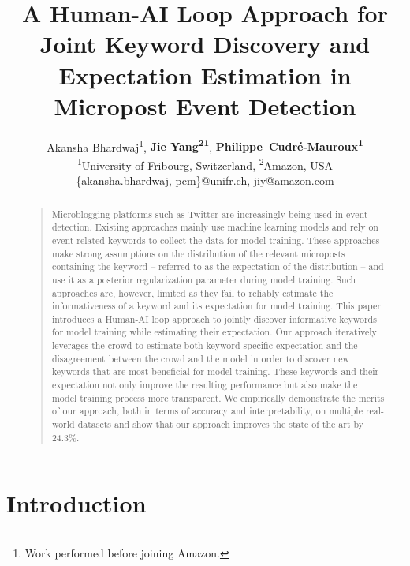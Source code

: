 \documentclass[letterpaper]{article}
\title{A Human-AI Loop Approach for Joint Keyword Discovery and Expectation Estimation in Micropost Event Detection}
\author{Akansha Bhardwaj\textsuperscript{\rm 1},  \Large \textbf{Jie Yang\textsuperscript{\rm 2}\thanks{Work performed before joining Amazon.}}, \Large \textbf{Philippe~Cudr\'e-Mauroux\textsuperscript{\rm 1}}\\ %
\textsuperscript{\rm 1}University of Fribourg, Switzerland, \textsuperscript{\rm 2}Amazon, USA\\ %
\{akansha.bhardwaj, pcm\}@unifr.ch, jiy@amazon.com\\ %
}
\begin{document}
\maketitle
\begin{abstract}
\begin{quote}

Microblogging platforms such as Twitter are increasingly being used in 
event detection. 
Existing approaches mainly use machine learning models and rely on event-related keywords to collect the data for model training. These approaches make strong assumptions on the distribution of the relevant microposts containing the keyword -- referred to as the expectation of the distribution -- and use it as a posterior regularization parameter during model training. Such approaches are, however, limited as they fail to reliably estimate the informativeness of a keyword and its expectation for model training. This paper introduces a Human-AI loop approach to jointly discover informative keywords for model training while estimating their expectation. Our approach iteratively leverages the crowd to estimate both keyword-specific expectation and the disagreement between the crowd and the model in order to discover new keywords that are most beneficial for model training. These keywords and their expectation not only improve the resulting performance but also make the model training process more transparent. We empirically demonstrate the merits of our approach, both in terms of accuracy and interpretability, on multiple real-world datasets and show that our approach improves the state of the art by 24.3\%.

\end{quote}
\end{abstract}

\section{Introduction}
\end{document}
